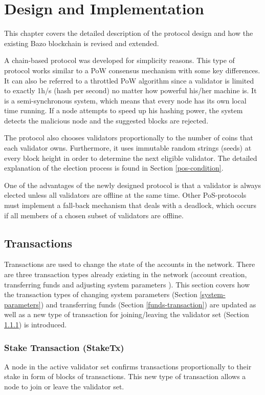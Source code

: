 \chapter{Design and Implementation}
This chapter covers the detailed description of the protocol design and how the existing Bazo blockchain is revised and extended.

A chain-based protocol was developed for simplicity reasons. This type of protocol works similar to a PoW consensus mechanism with some key differences. It can also be referred to a throttled PoW algorithm since a validator is limited to exactly 1h/s (hash per second) no matter how powerful his/her machine is. It is a semi-synchronous system, which means that every node has its own local time running. If a node attempts to speed up his hashing power, the system detects the malicious node and the suggested blocks are rejected. 

The protocol also chooses validators proportionally to the number of coins that each validator owns. Furthermore, it uses immutable random strings (seeds) at every block height in order to determine the next eligible validator. The detailed explanation of the election process is found in Section \ref{pos-condition}. 

One of the advantages of the newly designed protocol is that a validator is always elected unless all validators are offline at the same time. Other PoS-protocols must implement a fall-back mechanism that deals with a deadlock, which occurs if all members of a chosen subset of validators are offline.

\section{Transactions}
Transactions are used to change the state of the accounts in the network. There are three transaction types already existing in the network (account creation, transferring funds and adjusting system parameters \cite{bazo_paper}). This section covers how the transaction types of changing system parameters (Section \ref{system-parameters}) and transferring funds (Section \ref{funds-transaction}) are updated as well as a new type of transaction for joining/leaving the validator set (Section \ref{stake-transaction}) is introduced. 

\subsection{Stake Transaction (StakeTx)}\label{stake-transaction}
A node in the active validator set confirms transactions proportionally to their stake in form of blocks of transactions. This new type of transaction allows a node to join or leave the validator set.

